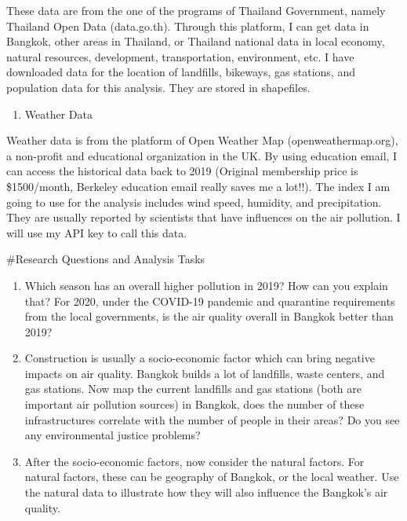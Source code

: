 \documentclass[
]{article}
\providecommand{\tightlist}{%
  \setlength{\itemsep}{0pt}\setlength{\parskip}{0pt}}
\begin{document}
These data are from the one of the programs of Thailand Government,
namely Thailand Open Data (data.go.th). Through this platform, I can get
data in Bangkok, other areas in Thailand, or Thailand national data in
local economy, natural resources, development, transportation,
environment, etc. I have downloaded data for the location of landfills,
bikeways, gas stations, and population data for this analysis. They are
stored in shapefiles.

\begin{enumerate}
\def\labelenumi{\arabic{enumi}.}
\setcounter{enumi}{2}
\tightlist
\item
  Weather Data
\end{enumerate}

Weather data is from the platform of Open Weather Map
(openweathermap.org), a non-profit and educational organization in the
UK. By using education email, I can access the historical data back to
2019 (Original membership price is \$1500/month, Berkeley education
email really saves me a lot!!). The index I am going to use for the
analysis includes wind speed, humidity, and precipitation. They are
usually reported by scientists that have influences on the air
pollution. I will use my API key to call this data.

\#Research Questions and Analysis Tasks

\begin{enumerate}
\def\labelenumi{\arabic{enumi}.}
\item
  Which season has an overall higher pollution in 2019? How can you
  explain that? For 2020, under the COVID-19 pandemic and quarantine
  requirements from the local governments, is the air quality overall in
  Bangkok better than 2019?
\item
  Construction is usually a socio-economic factor which can bring
  negative impacts on air quality. Bangkok builds a lot of landfills,
  waste centers, and gas stations. Now map the current landfills and gas
  stations (both are important air pollution sources) in Bangkok, does
  the number of these infrastructures correlate with the number of
  people in their areas? Do you see any environmental justice problems?
\item
  After the socio-economic factors, now consider the natural factors.
  For natural factors, these can be geography of Bangkok, or the local
  weather. Use the natural data to illustrate how they will also
  influence the Bangkok's air quality.
\end{enumerate}
\end{document}
